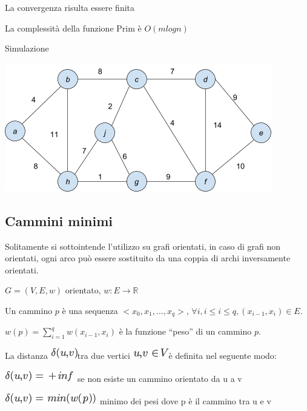 \documentclass{article}
\begin{document}


La convergenza risulta essere finita

La complessità della funzione Prim è $O(m logn)$

{Simulazione}

{\includegraphics{images/image542.png}}

\subsection{\texorpdfstring{{Cammini minimi}}{Cammini minimi}}\label{h.yl5v086nw9el}

{Solitamente si sottointende l'utilizzo su grafi orientati, in caso di grafi non orientati, ogni arco può essere sostituito da una coppia di archi inversamente orientati.}

$G=(V,E,w)$ orientato, $w:E\rightarrow \mathbb{R}$

Un cammino $p$ è una sequenza $<x_0,x_1,...,x_q>$, $\forall i, i\leq i \leq q, (x_{i-1},x_i) \in E$.

$w(p)=\sum_{i=1}^{q} w(x_{i-1},x_i)$ è la funzione ``peso'' di un cammino $p$.

{La distanza }\includegraphics{images/image494.png}{tra due vertici
}\includegraphics{images/image495.png}{è definita nel seguente modo:}

\includegraphics{images/image496.png}{~se non esiste un cammino orientato da u a v}

\includegraphics{images/image497.png}{~minimo dei pesi dove p
è il cammino tra u e v}
\end{document}

